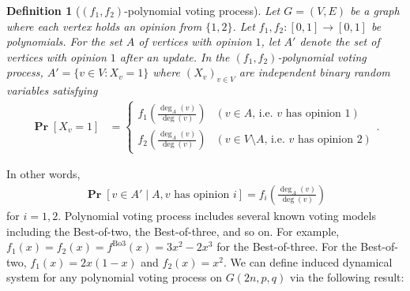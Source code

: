 \documentclass[letterpaper,11pt]{article}
\newtheorem{definition}[theorem]{Definition}
\newcommand{\Bthree}{\mathrm{Bo3}}
\renewcommand\Pr{\mathop{\mathbf{Pr}}}
\begin{document}
\begin{definition}[$(f_1,f_2)$-polynomial voting process]
Let $G=(V,E)$ be a graph where each vertex holds an opinion from $\{1,2\}$.
Let $f_1,f_2: [0,1]\to [0,1]$ be polynomials.
For the set $A$ of vertices with opinion $1$,
let $A'$ denote the set of vertices with opinion $1$ after an update.
In the $(f_1,f_2)$-polynomial voting process, $A'= \{v\in V: X_v=1\}$ where $(X_v)_{v\in V}$ are independent binary random variables satisfying
\begin{align*}
\Pr[X_v=1]&=
\begin{cases}
f_1\left(\frac{\deg_A(v)}{\deg(v)}\right) &(\textrm{$v\in A$, i.e.~$v$ has opinion $1$})\\
f_2\left(\frac{\deg_A(v)}{\deg(v)}\right) &(\textrm{$v\in V\setminus A$, i.e.~$v$ has opinion $2$})
\end{cases}.
\end{align*}
\end{definition}
In other words, 
\begin{align*}
\Pr[v\in A'\mid A,\text{$v$ has opinion $i$}] = f_i\left(\frac{\deg_A(v)}{\deg(v)}\right) %
\end{align*}
for $i=1,2$.
%
Polynomial voting process includes several known voting models including the Best-of-two, the Best-of-three, and so on.
For example, $f_1(x)=f_2(x)=f^{\Bthree}(x)=3x^2-2x^3$ for the Best-of-three.
For the Best-of-two, $f_1(x)=2x(1-x)$ and $f_2(x)=x^2$.
%
We can define induced dynamical system for any polynomial voting process on $G(2n,p,q)$ via the following result:
%
\end{document}
